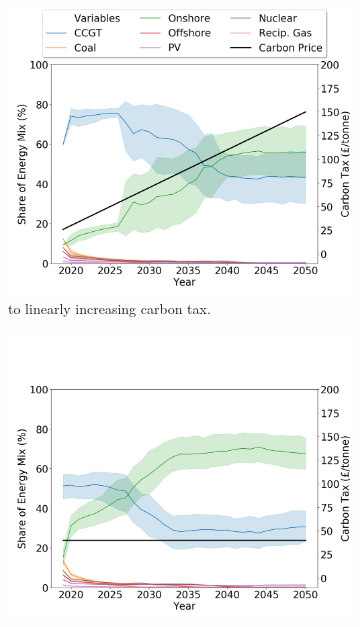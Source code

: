%

\begin{figure}
	\centering
	\begin{subfigure}{.8\linewidth}
		\includegraphics[width=\linewidth]{Chapter4/figures/scenarios/demand099-carbon18-datetime.png}
		\caption{ to  linearly increasing carbon tax.}
		\label{fig:demand99carbon18}
	\end{subfigure}
	\begin{subfigure}{.8\linewidth}
		\includegraphics[width=\linewidth]{Chapter4/figures/scenarios/demand099-carbon40-datetime.png}

\end{subfigure}
\end{figure}
